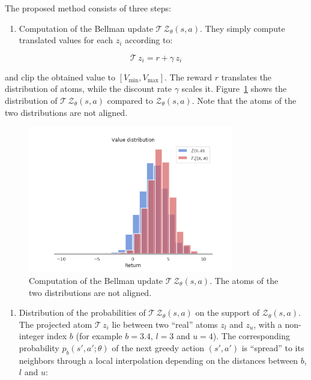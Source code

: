 \documentclass[
  letterpaper,
  DIV=11,
  numbers=noendperiod]{scrreprt}
\providecommand{\tightlist}{%
  \setlength{\itemsep}{0pt}\setlength{\parskip}{0pt}}\usepackage{longtable,booktabs,array}
\begin{document}
The proposed method consists of three steps:

\begin{enumerate}
\def\labelenumi{\arabic{enumi}.}
\tightlist
\item
  Computation of the Bellman update
  \(\mathcal{T} \, \mathcal{Z}_\theta(s, a)\). They simply compute
  translated values for each \(z_i\) according to:
\end{enumerate}

\[
    \mathcal{T} \, z_i = r + \gamma \, z_i
\]

and clip the obtained value to \([V_\text{min}, V_\text{max}]\). The
reward \(r\) translates the distribution of atoms, while the discount
rate \(\gamma\) scales it. Figure~\ref{fig-distributionallearning2}
shows the distribution of \(\mathcal{T} \, \mathcal{Z}_\theta(s, a)\)
compared to \(\mathcal{Z}_\theta(s, a)\). Note that the atoms of the two
distributions are not aligned.

\begin{figure}

{\centering \includegraphics[width=0.8\textwidth,height=\textheight]{./img/distributionallearning2.png}

}

\caption{\label{fig-distributionallearning2}Computation of the Bellman
update \(\mathcal{T} \, \mathcal{Z}_\theta(s, a)\). The atoms of the two
distributions are not aligned.}

\end{figure}

\begin{enumerate}
\def\labelenumi{\arabic{enumi}.}
\setcounter{enumi}{1}
\tightlist
\item
  Distribution of the probabilities of
  \(\mathcal{T} \, \mathcal{Z}_\theta(s, a)\) on the support of
  \(\mathcal{Z}_\theta(s, a)\). The projected atom
  \(\mathcal{T} \, z_i\) lie between two ``real'' atoms \(z_l\) and
  \(z_u\), with a non-integer index \(b\) (for example \(b = 3.4\),
  \(l = 3\) and \(u=4\)). The corresponding probability
  \(p_{b}(s', a'; \theta)\) of the next greedy action \((s', a')\) is
  ``spread'' to its neighbors through a local interpolation depending on
  the distances between \(b\), \(l\) and \(u\):
\end{enumerate}
\end{document}
